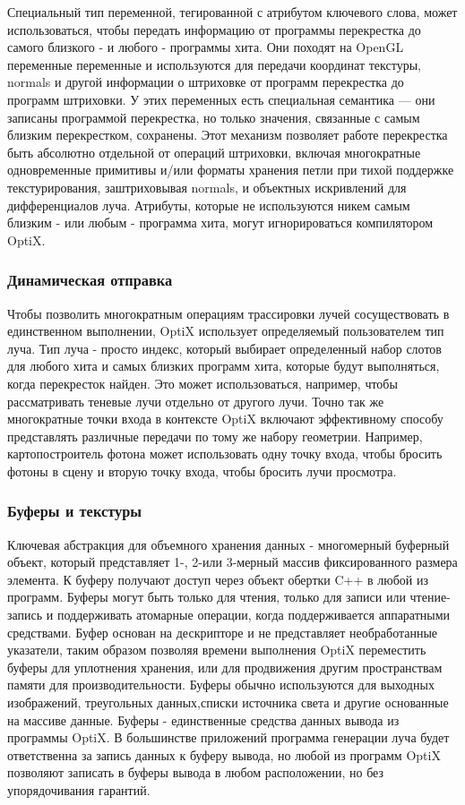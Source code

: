Специальный тип переменной, тегированной с атрибутом ключевого слова, может использоваться, чтобы передать информацию от программы перекрестка до самого близкого - и любого - программы хита. Они походят на OpenGL переменные переменные и используются для передачи координат текстуры, normals и другой информации о штриховке от программ перекрестка до программ штриховки. У этих переменных есть специальная семантика — они записаны программой перекрестка, но только значения, связанные с самым близким перекрестком, сохранены. Этот механизм позволяет работе перекрестка быть абсолютно отдельной от операций штриховки, включая многократные одновременные примитивы и/или форматы хранения петли при тихой поддержке текстурирования, заштриховывая normals, и объектных искривлений для дифференциалов луча. Атрибуты, которые не используются никем самым близким - или любым - программа хита, могут игнорироваться компилятором OptiX.
\subsubsection {Динамическая отправка}
Чтобы позволить многократным операциям трассировки лучей сосуществовать в единственном выполнении, OptiX использует определяемый пользователем тип луча. Тип луча - просто индекс, который выбирает определенный набор слотов для любого хита и самых близких программ хита, которые будут выполняться, когда перекресток найден. Это может использоваться, например, чтобы рассматривать теневые лучи отдельно от другого
лучи. Точно так же многократные точки входа в контексте OptiX включают эффективному способу представлять различные передачи по тому же набору геометрии. Например, картопостроитель фотона может использовать одну точку входа, чтобы бросить фотоны в сцену и вторую точку входа, чтобы бросить лучи просмотра.
\subsubsection{Буферы и текстуры}
Ключевая абстракция для объемного хранения данных - многомерный буферный объект, который представляет 1-, 2-или 3-мерный массив фиксированного размера элемента. К буферу получают доступ через объект обертки C++ в любой из программ. Буферы могут быть только для чтения, только для записи или чтение-запись и поддерживать атомарные операции, когда поддерживается аппаратными средствами. Буфер основан на дескрипторе и не представляет необработанные указатели, таким образом позволяя времени выполнения OptiX переместить буферы для уплотнения хранения, или для продвижения другим пространствам памяти для производительности.
Буферы обычно используются для выходных изображений, треугольных данных,списки источника света и другие основанные на массиве данные. Буферы - единственные средства данных вывода из программы OptiX. В большинстве приложений программа генерации луча будет ответственна за запись данных к буферу вывода, но любой из программ OptiX позволяют записать в буферы вывода в любом расположении, но без упорядочивания гарантий.

